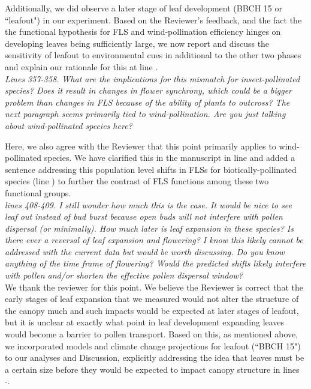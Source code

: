 \documentclass[11pt]{article}
\begin{document}
\noindent Additionally, we did observe a later stage of leaf development (BBCH 15 or ``leafout") in our experiment. Based on the Reviewer's feedback, and the fact the the functional hypothesis for FLS and wind-pollination efficiency hinges on developing leaves being sufficiently large, we now report and discuss the sensitivity of leafout to environmental cues in additional to the other two phases and explain our rationale for this at line .\\ 




\emph{Lines  357-358. What are the implications for this mismatch for insect-pollinated species? Does it result in changes in flower synchrony, which could be a bigger problem than changes in FLS because of the ability of plants to outcross? The next paragraph seems primarily tied to wind-pollination. Are you just talking about wind-pollinated species here?}
 
Here, we also agree with the Reviewer that this point primarily applies to wind-pollinated species. We have clarified this in the manuscript in line  and added a sentence addressing this population level shifts in FLSs for biotically-pollinated species (line ) to further the contrast of FLS functions among these two functional groups. \\
 
\emph{lines 408-409. I still wonder how much this is the case. It would be nice to see leaf out instead of bud burst because open buds will not interfere with pollen dispersal (or minimally). How much later is leaf expansion in these species? Is there ever a reversal of leaf expansion and flowering? I know this likely cannot be addressed with the current data but would be worth discussing. Do you know anything of the time frame of flowering? Would the predicted shifts likely interfere with pollen and/or shorten the effective pollen dispersal window?}\\

We thank the reviewer for this point. We believe the Reviewer is correct that the early stages of leaf expansion that we measured would not alter the structure of the canopy much and such impacts would be expected at later stages of leafout, but it is unclear at exactly what point in leaf development expanding leaves would become a barrier to pollen transport.
Based on this, as mentioned above, we incorporated models and climate change projections for leafout (``BBCH 15") to our analyses and Discussion, explicitly addressing the idea that leaves must be a certain size before they would be expected to impact canopy structure in lines -.\\
\end{document}
